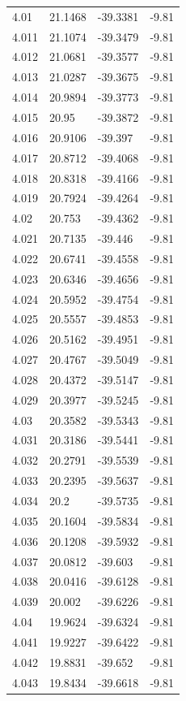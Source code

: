 \begin{tabular}{llll}
4.01 & 21.1468 & -39.3381 & -9.81 \\
4.011 & 21.1074 & -39.3479 & -9.81 \\
4.012 & 21.0681 & -39.3577 & -9.81 \\
4.013 & 21.0287 & -39.3675 & -9.81 \\
4.014 & 20.9894 & -39.3773 & -9.81 \\
4.015 & 20.95 & -39.3872 & -9.81 \\
4.016 & 20.9106 & -39.397 & -9.81 \\
4.017 & 20.8712 & -39.4068 & -9.81 \\
4.018 & 20.8318 & -39.4166 & -9.81 \\
4.019 & 20.7924 & -39.4264 & -9.81 \\
4.02 & 20.753 & -39.4362 & -9.81 \\
4.021 & 20.7135 & -39.446 & -9.81 \\
4.022 & 20.6741 & -39.4558 & -9.81 \\
4.023 & 20.6346 & -39.4656 & -9.81 \\
4.024 & 20.5952 & -39.4754 & -9.81 \\
4.025 & 20.5557 & -39.4853 & -9.81 \\
4.026 & 20.5162 & -39.4951 & -9.81 \\
4.027 & 20.4767 & -39.5049 & -9.81 \\
4.028 & 20.4372 & -39.5147 & -9.81 \\
4.029 & 20.3977 & -39.5245 & -9.81 \\
4.03 & 20.3582 & -39.5343 & -9.81 \\
4.031 & 20.3186 & -39.5441 & -9.81 \\
4.032 & 20.2791 & -39.5539 & -9.81 \\
4.033 & 20.2395 & -39.5637 & -9.81 \\
4.034 & 20.2 & -39.5735 & -9.81 \\
4.035 & 20.1604 & -39.5834 & -9.81 \\
4.036 & 20.1208 & -39.5932 & -9.81 \\
4.037 & 20.0812 & -39.603 & -9.81 \\
4.038 & 20.0416 & -39.6128 & -9.81 \\
4.039 & 20.002 & -39.6226 & -9.81 \\
4.04 & 19.9624 & -39.6324 & -9.81 \\
4.041 & 19.9227 & -39.6422 & -9.81 \\
4.042 & 19.8831 & -39.652 & -9.81 \\
4.043 & 19.8434 & -39.6618 & -9.81 \\

\end{tabular}
